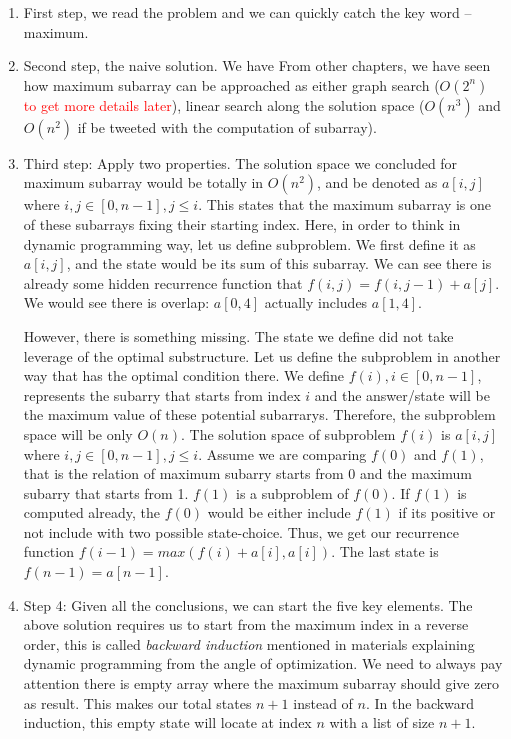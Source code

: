 \documentclass[../main.tex]{subfiles}
\begin{document}
\begin{enumerate}
    \item First step, we read the problem and we can quickly catch the key word -- maximum.  

\item Second step, the naive solution. We have From other chapters, we have seen how maximum subarray can be approached as either graph search ($O(2^n)$ \textcolor{red}{to get more details later}), linear search along the solution space ($O(n^3)$ and $O(n^2)$ if be tweeted with the computation of subarray). 

\item Third step: Apply two properties. The solution space we concluded for maximum subarray would be totally in $O(n^2)$, and be denoted as $a[i, j]$ where $i, j \in [0, n-1], j \leq i$. This states that the maximum subarray is one of these subarrays fixing their starting index.  Here, in order to think in dynamic programming way, let us define subproblem. We first define it as $a[i, j]$, and the state would be its sum of this subarray. We can see there is already some hidden recurrence function that $f(i, j)=f(i,j-1)+a[j]$. We would see there is overlap: $a[0, 4]$ actually includes $a[1, 4]$. 

However, there is something missing. The state we define did not take leverage of the optimal substructure. Let us define the subproblem in another way that has the optimal condition there. We define $f(i), i \in [0, n-1]$, represents the  subarry that starts from index $i$ and the answer/state will be the maximum value of these potential subarrarys. Therefore, the subproblem space will be only $O(n)$. The solution space of subproblem $f(i)$ is $a[i, j]$ where $i, j \in [0, n-1], j \leq i$. Assume we are comparing $f(0)$ and $f(1)$, that is the relation of maximum subarry starts from 0 and the maximum subarry that starts from 1. $f(1)$ is a subproblem of $f(0)$. If $f(1)$ is computed already, the $f(0)$ would be either include $f(1)$ if its positive or not include with two possible state-choice. Thus, we get our recurrence function $f(i-1)=max(f(i)+a[i], a[i])$. The last state is $f(n-1)=a[n-1]$. 

\item Step 4: Given all the conclusions, we can start the five key elements. The above solution requires us to start from the maximum index in a reverse order, this is called \textit{backward induction} mentioned in materials explaining dynamic programming from the angle of optimization. We need to always pay attention there is empty array where the maximum subarray should give zero as result. This makes our total states $n+1$ instead of $n$. In the backward induction, this empty state will locate at index $n$ with a list of size $n+1$. %


\end{enumerate}
\end{document}

